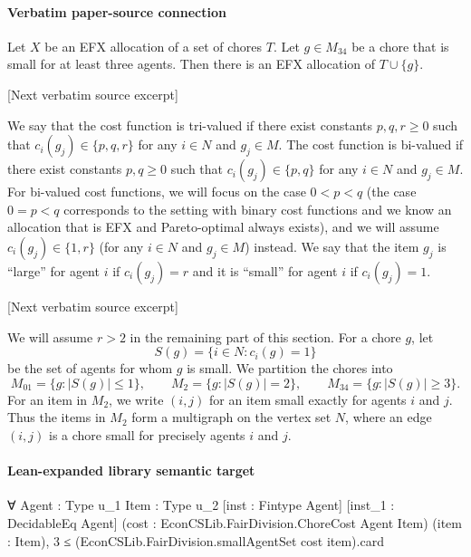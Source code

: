 \documentclass[10pt]{article}
\begin{document}
\paragraph{Verbatim paper-source connection}
\begin{ReviewVerbatim}
\begin{lemma}\label{lem:insertion}
Let $X$ be an EFX allocation of a set of chores $T$.  Let $g\in M_{34}$ be a
chore that is small for at least three agents.  Then there is an EFX
allocation of $T\cup\{g\}$.
\end{lemma}

[Next verbatim source excerpt]

We say that the cost function is tri-valued if there exist constants $p,q,r\geq 0$ such that $c_i(g_j)\in\{p,q,r\}$ for any $i\in N$ and $g_j\in M$.
The cost function is bi-valued if there exist constants $p,q\geq 0$ such that $c_i(g_j)\in\{p,q\}$ for any $i\in N$ and $g_j\in M$.
For bi-valued cost functions, we will focus on the case $0<p<q$ (the case $0=p<q$ corresponds to the setting with binary cost functions and we know an allocation that is EFX and Pareto-optimal always exists), and we will assume $c_i(g_j)\in\{1,r\}$ (for any $i\in N$ and $g_j\in M$) instead.
We say that the item $g_j$ is ``large'' for agent $i$ if $c_i(g_j)=r$ and it is ``small'' for agent $i$ if $c_i(g_j)=1$.

[Next verbatim source excerpt]

We will assume $r>2$ in the remaining part of this section.
For a chore $g$, let
\[
 S(g)=\{i\in N:c_i(g)=1\}
\]
be the set of agents for whom $g$ is small.  We partition the chores into
\[
M_{01}=\{g:|S(g)|\le 1\},\qquad
M_2=\{g:|S(g)|=2\},\qquad
M_{34}=\{g:|S(g)|\ge 3\}.
\]
For an item in $M_2$, we write $(i,j)$ for an item small exactly for agents
$i$ and $j$.  Thus the items in $M_2$ form a multigraph on the vertex set
$N$, where an edge $(i,j)$ is a chore small for precisely agents $i$ and $j$.
\end{ReviewVerbatim}

\paragraph{Lean-expanded library semantic target}
\begin{ReviewVerbatim}
∀ {Agent : Type u_1} {Item : Type u_2} [inst : Fintype Agent] [inst_1 : DecidableEq Agent]
  (cost : EconCSLib.FairDivision.ChoreCost Agent Item) (item : Item),
  3 ≤ (EconCSLib.FairDivision.smallAgentSet cost item).card
\end{ReviewVerbatim}
\end{document}
